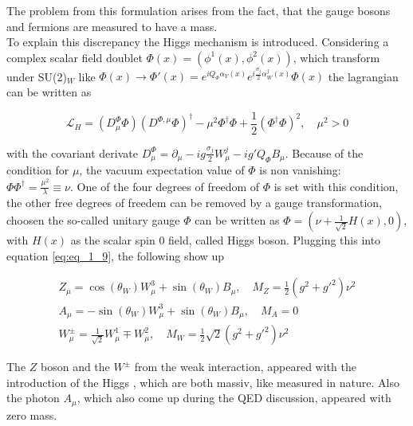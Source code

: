 The problem from this formulation arises from the fact, that the gauge bosons and fermions are measured to have a mass. \\

To explain this discrepancy the Higgs mechanism \cite{HIGGS} is introduced. Considering a complex scalar field doublet $\Phi(x) = (\phi^{1}(x), \phi^{2}(x))$, which transform under SU(2)$_{W}$ like $\Phi(x) \rightarrow \Phi'(x) = e^{iQ_{\Phi} \alpha_{Y}(x)} e^{i\frac{\sigma_{j}}{2}\alpha^{j}_{W}(x)}\Phi(x)$ the lagrangian can be written as

\begin{equation}
	\label{eq:eq_1_9}
	\mathcal{L}_{H} = (D^{\Phi}_{\mu}\Phi)(D^{\Phi, \mu}\Phi)^{\dagger} - \mu^2\Phi^{\dagger}\Phi + \frac{1}{2}(\Phi^{\dagger}\Phi)^2, \quad \mu^2 > 0
\end{equation}

with the covariant derivate $D^{\Phi}_{\mu} = \partial_{\mu}  - ig\frac{\sigma_{j}}{2}W^{j}_{\mu} - ig'Q_{\Phi}B_{\mu}$. Because of the condition for $\mu$, the vacuum expectation value of $\Phi$ is non vanishing: $\Phi\Phi^{\dagger} = \frac{\mu^2}{\lambda} \equiv \nu$. One of the four degrees of freedom of $\Phi$ is set with this condition, the other free degrees of freedem can be removed by a gauge transformation, choosen the so-called unitary gauge $\Phi$ can be written as $\Phi = (\nu + \frac{1}{\sqrt{2}}H(x), 0)$, with $H(x)$ as the scalar spin 0 field, called Higgs boson. Plugging this into equation \ref{eq:eq_1_9}, the following show up

\begin{equation}
	\label{eq:eq_1_10}
	\begin{split}
		Z_{\mu} = \cos(\theta_{W})W^{3}_{\mu} + \sin(\theta_{W})B_{\mu}, \quad M_{Z} = \frac{1}{2}(g^2 + g'^2)\nu^2 \\
		A_{\mu} = -\sin(\theta_{W})W^{3}_{\mu} + \sin(\theta_{W})B_{\mu}, \quad M_{A} = 0 \\
		W^{\pm}_{\mu} = \frac{1}{\sqrt{2}}W^{1}_{\mu} \mp W^{2}_{\mu}, \quad M_{W} = \frac{1}2{\sqrt{2}}(g^2+g'^2)\nu^2
	\end{split}
\end{equation}

The $Z$ boson and the $W^{\pm}$ from the weak interaction, appeared with the introduction of the Higgs \cite{HIGGDISCOVER}, which are both massiv, like measured in nature. Also the photon $A_{\mu}$, which also come up during the \gls{QED} discussion, appeared with zero mass. 




